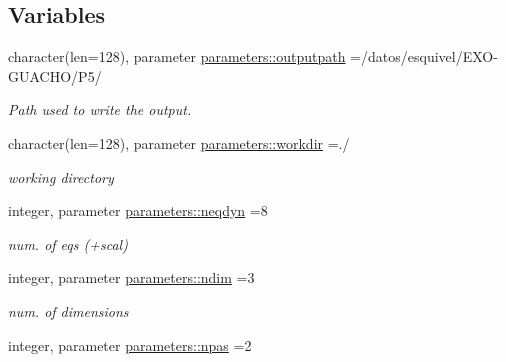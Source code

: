\subsection*{Variables}
\begin{DoxyCompactItemize}
\item 
\hypertarget{namespaceparameters_adfc2b2bb3e3f9614e8b171561f9eb78d}{}character(len=128), parameter \hyperlink{namespaceparameters_adfc2b2bb3e3f9614e8b171561f9eb78d}{parameters\+::outputpath} =\textquotesingle{}/datos/esquivel/E\+X\+O-\/G\+U\+A\+C\+H\+O/P5/\textquotesingle{}\label{namespaceparameters_adfc2b2bb3e3f9614e8b171561f9eb78d}

\begin{DoxyCompactList}\small\item\em Path used to write the output. \end{DoxyCompactList}\item 
\hypertarget{namespaceparameters_afe25db26aa30836573528cd959ee1fca}{}character(len=128), parameter \hyperlink{namespaceparameters_afe25db26aa30836573528cd959ee1fca}{parameters\+::workdir} =\textquotesingle{}./\textquotesingle{}\label{namespaceparameters_afe25db26aa30836573528cd959ee1fca}

\begin{DoxyCompactList}\small\item\em working directory \end{DoxyCompactList}\item 
\hypertarget{namespaceparameters_ad2e282b7f56de824d72b1acf9f8aa674}{}integer, parameter \hyperlink{namespaceparameters_ad2e282b7f56de824d72b1acf9f8aa674}{parameters\+::neqdyn} =8\label{namespaceparameters_ad2e282b7f56de824d72b1acf9f8aa674}

\begin{DoxyCompactList}\small\item\em num. of eqs (+scal) \end{DoxyCompactList}\item 
\hypertarget{namespaceparameters_af1edd81ebd6b46141bb93b90084b172e}{}integer, parameter \hyperlink{namespaceparameters_af1edd81ebd6b46141bb93b90084b172e}{parameters\+::ndim} =3\label{namespaceparameters_af1edd81ebd6b46141bb93b90084b172e}

\begin{DoxyCompactList}\small\item\em num. of dimensions \end{DoxyCompactList}\item 
\hypertarget{namespaceparameters_a5cce81231f97dddc9a7abc8ad2691fcf}{}integer, parameter \hyperlink{namespaceparameters_a5cce81231f97dddc9a7abc8ad2691fcf}{parameters\+::npas} =2\label{namespaceparameters_a5cce81231f97dddc9a7abc8ad2691fcf}


\end{DoxyCompactItemize}
